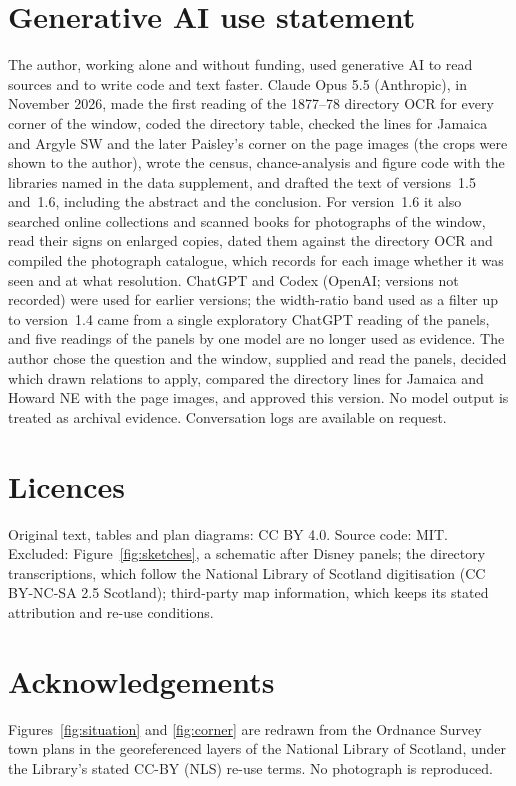 \documentclass[10pt,a4paper]{article}
\begin{document}
\section*{Generative AI use statement}
The author, working alone and without funding, used generative AI to read sources and to write code and text faster. Claude Opus 5.5 (Anthropic), in November 2026, made the first reading of the 1877--78 directory OCR for every corner of the window, coded the directory table, checked the lines for Jamaica and Argyle SW and the later Paisley's corner on the page images (the crops were shown to the author), wrote the census, chance-analysis and figure code with the libraries named in the data supplement, and drafted the text of versions~1.5 and~1.6, including the abstract and the conclusion. For version~1.6 it also searched online collections and scanned books for photographs of the window, read their signs on enlarged copies, dated them against the directory OCR and compiled the photograph catalogue, which records for each image whether it was seen and at what resolution. ChatGPT and Codex (OpenAI; versions not recorded) were used for earlier versions; the width-ratio band used as a filter up to version~1.4 came from a single exploratory ChatGPT reading of the panels, and five readings of the panels by one model are no longer used as evidence. The author chose the question and the window, supplied and read the panels, decided which drawn relations to apply, compared the directory lines for Jamaica and Howard NE with the page images, and approved this version. No model output is treated as archival evidence. Conversation logs are available on request.

\section*{Licences}
Original text, tables and plan diagrams: CC BY 4.0. Source code: MIT. Excluded: Figure~\ref{fig:sketches}, a schematic after Disney panels; the directory transcriptions, which follow the National Library of Scotland digitisation (CC BY-NC-SA 2.5 Scotland); third-party map information, which keeps its stated attribution and re-use conditions.

\section*{Acknowledgements}
Figures~\ref{fig:situation} and \ref{fig:corner} are redrawn from the Ordnance Survey town plans in the georeferenced layers of the National Library of Scotland, under the Library's stated CC-BY (NLS) re-use terms. No photograph is reproduced.



\end{document}
